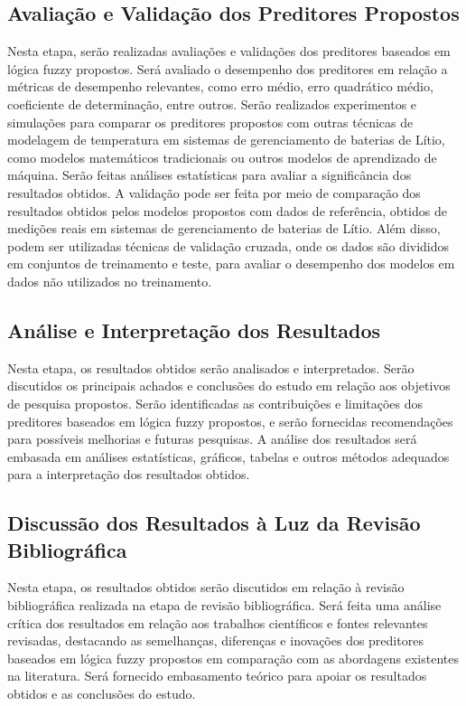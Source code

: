 \subsection{Avaliação e Validação dos Preditores Propostos}
Nesta etapa, serão realizadas avaliações e validações dos preditores baseados em lógica fuzzy propostos. Será avaliado o desempenho dos preditores em relação a métricas de desempenho relevantes, como erro médio, erro quadrático médio, coeficiente de determinação, entre outros. Serão realizados experimentos e simulações para comparar os preditores propostos com outras técnicas de modelagem de temperatura em sistemas de gerenciamento de baterias de Lítio, como modelos matemáticos tradicionais ou outros modelos de aprendizado de máquina. Serão feitas análises estatísticas para avaliar a significância dos resultados obtidos. A validação pode ser feita por meio de comparação dos resultados obtidos pelos modelos propostos com dados de referência, obtidos de medições reais em sistemas de gerenciamento de baterias de Lítio. Além disso, podem ser utilizadas técnicas de validação cruzada, onde os dados são divididos em conjuntos de treinamento e teste, para avaliar o desempenho dos modelos em dados não utilizados no treinamento.

\subsection{Análise e Interpretação dos Resultados}
Nesta etapa, os resultados obtidos serão analisados e interpretados. Serão discutidos os principais achados e conclusões do estudo em relação aos objetivos de pesquisa propostos. Serão identificadas as contribuições e limitações dos preditores baseados em lógica fuzzy propostos, e serão fornecidas recomendações para possíveis melhorias e futuras pesquisas. A análise dos resultados será embasada em análises estatísticas, gráficos, tabelas e outros métodos adequados para a interpretação dos resultados obtidos.

\subsection{Discussão dos Resultados à Luz da Revisão Bibliográfica}
Nesta etapa, os resultados obtidos serão discutidos em relação à revisão bibliográfica realizada na etapa de revisão bibliográfica. Será feita uma análise crítica dos resultados em relação aos trabalhos científicos e fontes relevantes revisadas, destacando as semelhanças, diferenças e inovações dos preditores baseados em lógica fuzzy propostos em comparação com as abordagens existentes na literatura. Será fornecido embasamento teórico para apoiar os resultados obtidos e as conclusões do estudo.

